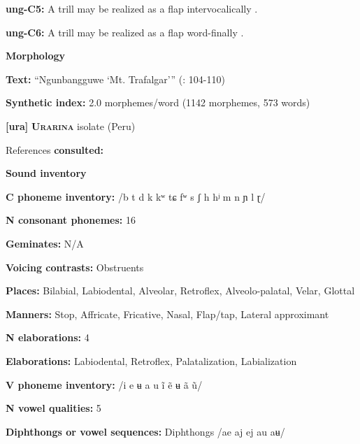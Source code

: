 \textbf{ung-C5:} A trill may be realized as a flap intervocalically \citep[12]{Rumsey1978}.



\textbf{ung-C6:} A trill may be realized as a flap word-finally \citep[12]{Rumsey1978}.



\textbf{Morphology}



\textbf{Text:} “Ngunbangguwe ‘Mt. Trafalgar’” (\citealt{CoateOates1970}: 104-110)



\textbf{Synthetic index:} 2.0 morphemes/word (1142 morphemes, 573 words)



\textbf{[ura]}   \textbf{\textsc{Urarina}}  isolate (Peru)



References \textbf{consulted:} \citet{Olawsky2006}



\textbf{Sound inventory}



\textbf{C phoneme inventory:} /b t d k kʷ tɕ fʷ s ʃ h hʲ m n ɲ l ɽ/



\textbf{N consonant phonemes:} 16



\textbf{Geminates:} N/A



\textbf{Voicing contrasts:} Obstruents



\textbf{Places:} Bilabial, Labiodental, Alveolar, Retroflex, Alveolo-palatal, Velar, Glottal



\textbf{Manners:} Stop, Affricate, Fricative, Nasal, Flap/tap, Lateral approximant



\textbf{N elaborations:} 4



\textbf{Elaborations:} Labiodental, Retroflex, Palatalization, Labialization



\textbf{V phoneme inventory:} /i e ʉ a u ĩ ẽ ʉ ã ũ/



\textbf{N vowel qualities:} 5



\textbf{Diphthongs or vowel sequences:} Diphthongs /ae aj ej au aʉ/



